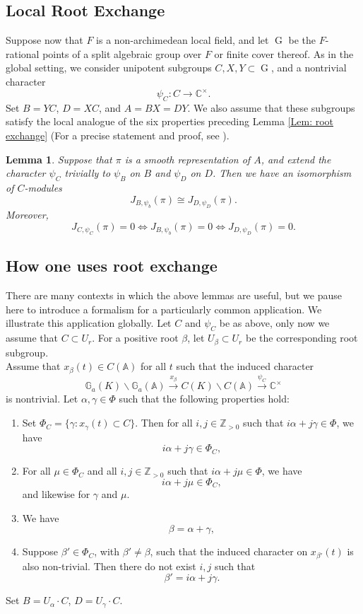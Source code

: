 \documentclass[11pt,reqno]{amsart}
\newtheorem{Lem}[Thm]{Lemma}
\theoremstyle{definition}
\theoremstyle{remark}
\theoremstyle{definition}
\begin{document}
\subsection{Local Root Exchange}
Suppose now that $F$ is a non-archimedean local field, and let $\operatorname{G}$ be the $F$-rational points of a split algebraic group over $F$ or finite cover thereof. As in the global setting,  we consider unipotent subgroups $C, X, Y\subset \operatorname{G}$, and a nontrivial character
\[
\psi_C:C\to{\mathbb C}^\times.
\] 
Set $B=YC$, $D=XC$,  and $A=BX=DY$. We also assume that these subgroups satisfy the local analogue of the six properties preceding Lemma \ref{Lem: root exchange} (For a precise statement and proof, see \cite[Section 6.1]{C}).
\begin{Lem}\label{Lem: local root exchange}
Suppose that $\pi$ is a smooth representation of $A$, and extend the character $\psi_C$ trivially to $\psi_B$ on $B$ and $\psi_D$ on $D$. Then we have an isomorphism of $C$-modules
\[
J_{B,\psi_b}(\pi)\cong J_{D,\psi_D}(\pi).
\]
Moreover,
\[
J_{C,\psi_C}(\pi)=0\iff J_{B,\psi_b}(\pi)=0\iff  J_{D,\psi_D}(\pi)=0.
\]
\end{Lem}
\subsection{How one uses root exchange} 

There are many contexts in which the above lemmas are useful, but we pause here to introduce a formalism for a particularly common application. We illustrate this application globally. Let $C$ and $\psi_C$ be as above, only now we assume that $C\subset U_r$. For a positive root ${\beta}$, let $U_{\beta}\subset U_r$ be the corresponding root subgroup. \\

Assume that $x_{\beta}(t)\in C({\mathbb A})$ for all $t$ such that the induced character
\[
\mathbb{G}_a(K){\backslash}\mathbb{G}_a({\mathbb A})\xrightarrow{x_{\beta}}C(K){\backslash} C({\mathbb A}) \xrightarrow{\psi_C} {\mathbb C}^\times
\]
is nontrivial. Let ${\alpha}, {\gamma} \in \Phi$ such that the following properties hold:
\begin{enumerate}
\item Set $\Phi_C = \{{\gamma} : x_{\gamma}(t) \subset C\}$. Then for all $i,j\in {\mathbb Z}_{>0}$ such that $i{\alpha}+j{\gamma} \in \Phi$, 
we have $$i{\alpha}+j{\gamma} \in \Phi_C,$$
\item For all $\mu \in \Phi_C$ and all $i,j\in {\mathbb Z}_{>0}$ such that $i{\alpha}+j\mu \in \Phi$, we have $$i{\alpha}+j\mu \in \Phi_C,$$ and likewise for ${\gamma}$ and $\mu$.
\item We have $${\beta} ={\alpha}+{\gamma},$$ 
\item Suppose ${\beta}'\in \Phi_C$, with ${\beta}'\neq {\beta}$, such that the induced character on $x_{{\beta}'}(t)$ is also non-trivial. Then there do not exist $i,j$ such that $${\beta}' = i{\alpha}+j{\gamma}.$$
\end{enumerate}
Set  $B = U_{\alpha}\cdot C$, $D=U_{\gamma}\cdot C$.\\
\end{document}
